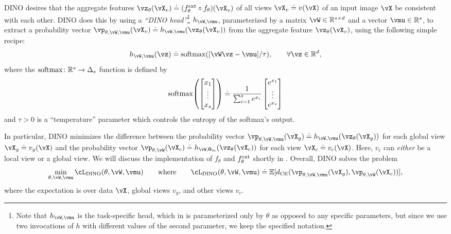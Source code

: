 \documentclass[../../book-main.tex]{subfiles}
\begin{document}
DINO desires that the aggregate features \(\vz_{\theta}(\vX_{v}) \doteq (f_{\theta}^{\ext} \circ f_{\theta})(\vX_{v})\) of all views \(\vX_{v} \doteq v(\vX)\) of an input image \(\vX\) be consistent with each other. DINO does this by using a \textit{``DINO head''}\footnote{Note that \(h_{\vW, \vmu}\) is the task-specific head, which in  is parameterized only by \(\theta\) as opposed to any specific parameters, but since we use two invocations of \(h\) with different values of the second parameter, we keep the specified notation.} \(h_{\vW, \vmu}\), parameterized by a matrix \(\vW \in \R^{s \times d}\) and a vector \(\vmu \in \R^{s}\), to extract a probability vector \(\vp_{\theta, \vW, \vmu}(\vX_{v}) \doteq h_{\vW, \vmu}(\vz_{\theta}(\vX_{v}))\) from the aggregate feature \(\vz_{\theta}(\vX_{v})\), using the following simple recipe:
\begin{equation}
    h_{\vW, \vmu}(\vz) \doteq \softmax([\vW\vz - \vmu]/\tau), \qquad \forall \vz \in \R^{d},
\end{equation}
where the \(\operatorname{\mathrm{softmax}} \colon \mathbb{R}^{s} \to \Delta_{s}\) function is defined by 
\begin{equation}
    \softmax\rp{\mat{x_{1} \\ \vdots \\ x_{s}}} \doteq \frac{1}{\sum_{i = 1}^{s}e^{x_{i}}}\mat{e^{x_{1}} \\ \vdots \\ e^{x_{s}}}
\end{equation}
and \(\tau > 0\) is a ``temperature'' parameter which controls the entropy of the softmax's output.

In particular, DINO minimizes the difference between the probability vector \(\vp_{\theta, \vW, \vmu}(\vX_{g}) \doteq h_{\vW, \vmu}(\vz_{\theta}(\vX_{g}))\) for each global view \(\vX_{g} \doteq v_{g}(\vX)\) and the probability vector \(\vp_{\theta, \vW}(\vX_{c}) \doteq h_{\vW, \vzero_{m}}(\vz_{\theta}(\vX_{c}))\) for each view \(\vX_{c} \doteq v_{c}(\vX)\). Here, \(v_{c}\) can \textit{either} be a local view or a global view. We will discuss the implementation of \(f_{\theta}\) and \(f_{\theta}^{\mathrm{ext}}\) shortly in . Overall, DINO solves the problem
 \begin{equation}\label{eq:dino_loss}
     \min_{\theta, \vW, \vmu}\cL_{\dino}(\theta, \vW, \vmu) \qquad \text{where} \qquad \cL_{\dino}(\theta, \vW, \vmu) \doteq \Ex[d_{\CE}(\vp_{\theta, \vW, \vmu}(\vX_{g}), \vp_{\theta, \vW}(\vX_{c}))],
\end{equation}
where the expectation is over data \(\vX\), global views \(v_{g}\), and other views \(v_{c}\).
\end{document}
